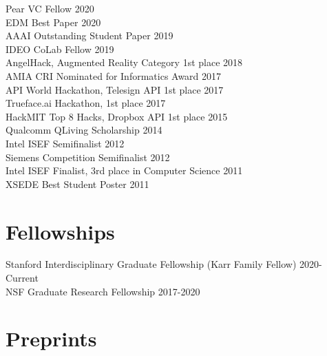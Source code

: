 \documentclass[margin, 10pt]{res} %
\begin{document}
\begin{resume}
Pear VC Fellow \hfill 2020 \\
EDM Best Paper \hfill 2020 \\
AAAI Outstanding Student Paper \hfill 2019 \\
IDEO CoLab Fellow \hfill 2019 \\
AngelHack, Augmented Reality Category 1st place \hfill 2018 \\
AMIA CRI Nominated for Informatics Award \hfill 2017 \\
API World Hackathon, Telesign API 1st place \hfill 2017 \\
Trueface.ai Hackathon, 1st place \hfill 2017 \\
HackMIT Top 8 Hacks, Dropbox API 1st place \hfill 2015 \\
Qualcomm QLiving Scholarship \hfill 2014 \\
Intel ISEF Semifinalist \hfill 2012 \\
Siemens Competition Semifinalist \hfill 2012 \\
Intel ISEF Finalist, 3rd place in Computer Science \hfill 2011 \\
XSEDE Best Student Poster \hfill 2011 \\

\section{Fellowships}
Stanford Interdisciplinary Graduate Fellowship (Karr Family Fellow) \hfill 2020-Current \\
NSF Graduate Research Fellowship \hfill 2017-2020 \\




\section{Preprints}


\end{resume}
\end{document}
